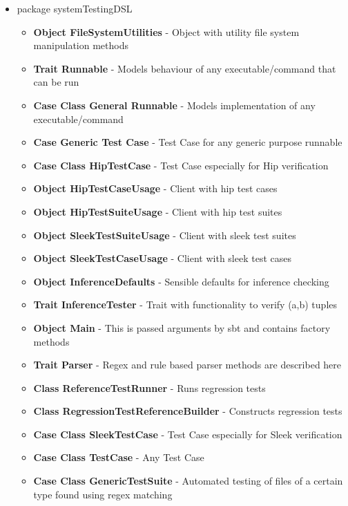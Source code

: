 \begin{itemize}
\item package systemTestingDSL
    \begin{itemize}
        \item \textbf{Object FileSystemUtilities} - Object with utility file system manipulation methods
        \item \textbf{Trait Runnable} - Models behaviour of any executable/command that can be run
        \item \textbf{Case Class General Runnable} - Models implementation of any executable/command 
        \item \textbf{Case Generic Test Case} - Test Case for any generic purpose runnable
        \item \textbf{Case Class HipTestCase} - Test Case especially for Hip verification
        \item \textbf{Object HipTestCaseUsage} - Client with hip test cases
        \item \textbf{Object HipTestSuiteUsage} - Client with hip test suites
        \item \textbf{Object SleekTestSuiteUsage} - Client with sleek test suites
        \item \textbf{Object SleekTestCaseUsage} - Client with sleek test cases
        \item \textbf{Object InferenceDefaults} - Sensible defaults for inference checking
        \item \textbf{Trait InferenceTester} - Trait with functionality to verify (a,b) tuples
        \item \textbf{Object Main} - This is passed arguments by sbt and contains factory methods
        \item \textbf{Trait Parser} - Regex and rule based parser methods are described here
        \item \textbf{Class ReferenceTestRunner} - Runs regression tests
        \item \textbf{Class RegressionTestReferenceBuilder} - Constructs regression tests
        \item \textbf{Case Class SleekTestCase} - Test Case especially for Sleek verification
        \item \textbf{Case Class TestCase} - Any Test Case
        \item \textbf{Case Class GenericTestSuite} - Automated testing of files of a certain type found          using regex matching
        

\end{itemize}
\end{itemize}

